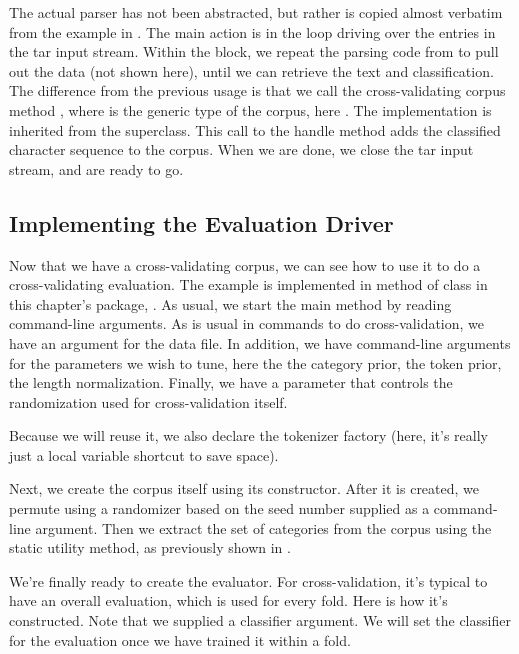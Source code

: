 The actual parser has not been abstracted, but rather is copied almost
verbatim from the example in .  The
main action is in the loop driving over the entries in the tar input
stream.
%
%
Within the block, we repeat the parsing code from
 to pull out the data (not shown here),
until we can retrieve the text and classification.  
%
%
The difference from the previous usage is that we call the
cross-validating corpus method , where  is the
generic type of the corpus, here .  The
implementation is inherited from the superclass.  This call to the
handle method adds the classified character sequence to the corpus.
When we are done, we close the tar input stream, and are ready to go.


\subsection{Implementing the Evaluation Driver}

Now that we have a cross-validating corpus, we can see how to use it
to do a cross-validating evaluation.  The example is implemented in
 method of class  in this
chapter's package, .  As usual, we start the
main method by reading command-line arguments.  
%
%
As is usual in commands to do cross-validation, we have an argument
for the data file.  In addition, we have command-line arguments for
the parameters we wish to tune, here the the category prior, the token
prior, the length normalization.  Finally, we have a parameter that
controls the randomization used for cross-validation itself.  

Because we will reuse it, we also declare the tokenizer factory (here,
it's really just a local variable shortcut to save space).
%
%

Next, we create the corpus itself using its constructor.
%
%
After it is created, we permute using a randomizer based on the seed
number supplied as a command-line argument.  Then we extract the set
of categories from the corpus using the static utility method, as
previously shown in .

We're finally ready to create the evaluator.  For cross-validation,
it's typical to have an overall evaluation, which is used for
every fold.  Here is how it's constructed.
%
%
Note that we supplied a  classifier argument.  We will
set the classifier for the evaluation once we have trained it
within a fold.

